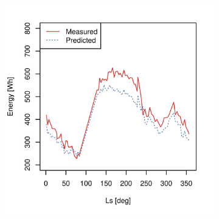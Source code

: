 \begin{figure}[h]
\captionsetup[subfigure]{justification=centering}
\vspace{-2ex}
	\centering
    \setlength{\subfigureWidth}{0.32\textwidth}
    \setlength{\graphicsHeight}{50mm}
    \hypersetup{hidelinks=true}%
	\begin{subfigure}[t]{\subfigureWidth}
        \centering
		\includegraphics[height=\graphicsHeight]{sections/appendix/energy-error-margin/plots/predicted-vs-measured-energy-my29-adjusted.png}
		\label{fig:plot:sub:mer-energy-production-predicted-vs-reported-my29-adjusted}
	\end{subfigure}\hfill
	\begin{subfigure}[t]{\subfigureWidth}
        \centering

\end{subfigure}
\end{figure}
